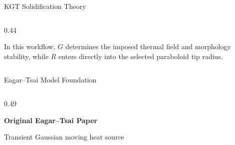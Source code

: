 \documentclass[aspectratio=169,11pt]{beamer}
\begin{document}
\begin{frame}{KGT Solidification Theory}
\begin{columns}[T,onlytextwidth]
\begin{column}{0.44\textwidth}
      \vspace{0.2em}
      {\fontsize{13}{16}\selectfont\textcolor{neutralmid}{In this workflow, $G$ determines the imposed thermal field and morphology stability, while $R$ enters directly into the selected paraboloid tip radius.}\par}
    \end{column}
  \end{columns}
\end{frame}

\begin{frame}{Eagar--Tsai Model Foundation}
  \vspace{-0.55em}
  \begin{columns}[T,onlytextwidth]
    \begin{column}{0.49\textwidth}
      \centering
      {\fontsize{22}{26}\selectfont\textcolor{sffblue}{\textbf{Original Eagar--Tsai Paper}}\par}
      \vspace{0.28em}

      {\fontsize{15}{18}\selectfont Transient Gaussian moving heat source}
      \vspace{0.35em}


\end{column}
\end{columns}
\end{frame}
\end{document}
